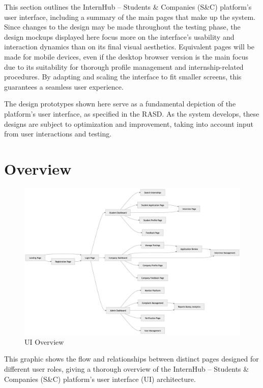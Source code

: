 This section outlines the InternHub – Students \& Companies (S\&C) platform's user interface, including a summary of the main pages that make up the system. Since changes to the design may be made throughout the testing phase, the design mockups displayed here focus more on the interface's usability and interaction dynamics than on its final visual aesthetics. Equivalent pages will be made for mobile devices, even if the desktop browser version is the main focus due to its suitability for thorough profile management and internship-related procedures. By adapting and scaling the interface to fit smaller screens, this guarantees a seamless user experience.

The design prototypes shown here serve as a fundamental depiction of the platform's user interface, as specified in the RASD. As the system develops, these designs are subject to optimization and improvement, taking into account input from user interactions and testing.

\section{Overview}
\label{sec:overview}%
\begin{figure}[H]
    \begin{center}
        \includegraphics[width=0.82\linewidth]{JhaBhatiaSharma/imagesDD/UIOverview.png}
        \caption{UI Overview}
        \label{fig:uiOverview}
    \end{center}
\end{figure}

This graphic shows the flow and relationships between distinct pages designed for different user roles, giving a thorough overview of the InternHub – Students \& Companies (S\&C) platform's user interface (UI) architecture. 

